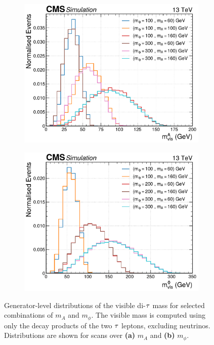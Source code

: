 \begin{figure}[h]
        \centering
        \begin{subfigure}[b]{0.7\textwidth}
            \centering
            \includegraphics[width=\textwidth]{Figures/Chapter6/mvis_A.pdf}
            \caption{}
        \end{subfigure}
        \hfill
        \begin{subfigure}[b]{0.7\textwidth}
            \centering
            \includegraphics[width=\textwidth]{Figures/Chapter6/mvis_phi.pdf}
            \caption{}
        \end{subfigure}
    \caption[Generator-level visible mass distributions for different mass combinations of $\phi$ and A.]{Generator-level distributions of the visible di-$\tau$ mass for selected combinations of $m_A$ and $m_\phi$. The visible mass is computed using only the decay products of the two $\tau$ leptons, excluding neutrinos. Distributions are shown for scans over \textbf{(a)} $m_A$ and \textbf{(b)} $m_\phi$.}
    \label{Figure:Chapter6_GenVisDistributions}
\end{figure}
\clearpage

